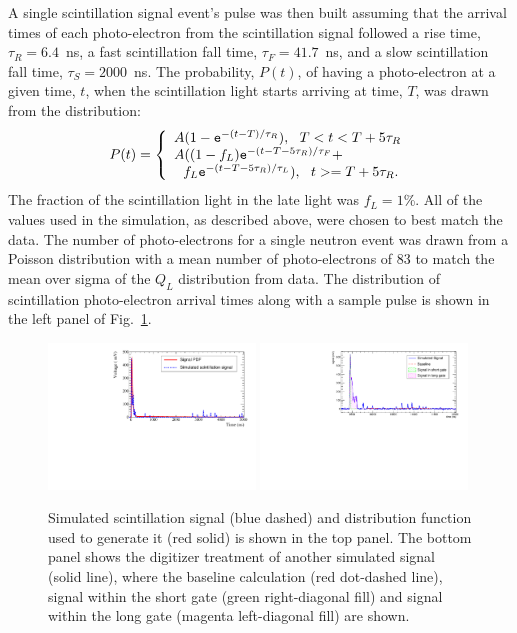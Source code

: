 \documentclass[letter,twocolumn,preprint,3p,numbers,sort&compress]{elsarticle}
\begin{document}
A single scintillation signal event's pulse was then built assuming
that the arrival times of each photo-electron from the scintillation
signal followed a rise time, $\tau_R=6.4$~ns, a fast scintillation
fall time, $\tau_F=41.7$~ns, and a slow scintillation fall time,
$\tau_S=2000$~ns.  The probability, $P(t)$, of having a photo-electron
at a given time, $t$, when the scintillation light starts arriving at
time, $T$, was drawn from the distribution:
\begin{equation}
  P(t) = \left\{
    \begin{array}{l}
      A ( 1 - {\tt e}^{-(t-T)/\tau_R } ),\ \ T<t<T+5\tau_R \\
      A ( (1-f_L) {\tt e}^{ -(t-T-5\tau_R)/\tau_F } +   \\
      \ \ f_L {\tt e}^{ -(t-T-5\tau_R)/\tau_L } ),\ \  t>=T+5\tau_R.
    \end{array}
    \right.
\end{equation}
The fraction of the scintillation light in the late light was
$f_L=1$\%.  All of the values used in the simulation, as described
above, were chosen to best match the data.  The number of
photo-electrons for a single neutron event was drawn from a Poisson
distribution with a mean number of photo-electrons of 83 to match the
mean over sigma of the $Q_L$ distribution from data.  The distribution
of scintillation photo-electron arrival times along with a sample
pulse is shown in the left panel of Fig.~\ref{fig:signalpdf}.

\begin{figure}[!htpb]
\centering
\includegraphics[width=0.49\textwidth]{figures/signalpulse.pdf}
\includegraphics[width=0.49\textwidth]{figures/digisimexample.pdf}
\caption{ Simulated scintillation signal (blue dashed) and
  distribution function used to generate it (red solid) is shown in
  the top panel.  The bottom panel shows the digitizer treatment of
  another simulated signal (solid line), where the baseline
  calculation (red dot-dashed line), signal within the short gate
  (green right-diagonal fill) and signal within the long gate (magenta
  left-diagonal fill) are shown.}\label{fig:signalpdf}
\end{figure}
\end{document}
